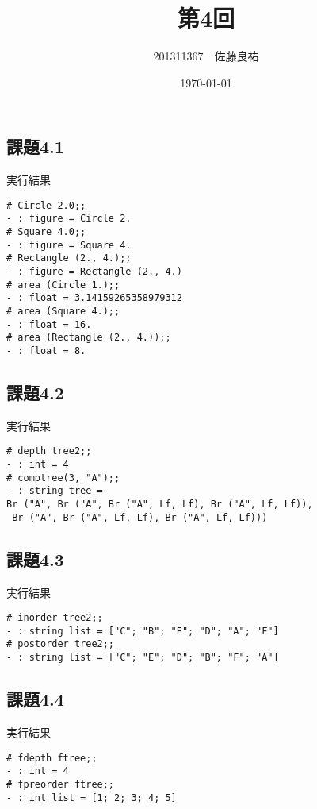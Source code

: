 \documentclass[11pt,a4j]{jarticle}
\title{第4回}
\author{201311367　佐藤良祐}
\date{\today}
\begin{document}
\subsection*{課題4.1}

実行結果
\begin{lstlisting}
# Circle 2.0;;
- : figure = Circle 2.
# Square 4.0;;
- : figure = Square 4.
# Rectangle (2., 4.);;
- : figure = Rectangle (2., 4.)
# area (Circle 1.);;
- : float = 3.14159265358979312
# area (Square 4.);;
- : float = 16.
# area (Rectangle (2., 4.));;
- : float = 8.
\end{lstlisting}
\subsection*{課題4.2}

\newpage
実行結果
\begin{lstlisting}
# depth tree2;;
- : int = 4
# comptree(3, "A");;
- : string tree =
Br ("A", Br ("A", Br ("A", Lf, Lf), Br ("A", Lf, Lf)),
 Br ("A", Br ("A", Lf, Lf), Br ("A", Lf, Lf)))
\end{lstlisting}
\subsection*{課題4.3}

実行結果
\begin{lstlisting}
# inorder tree2;;
- : string list = ["C"; "B"; "E"; "D"; "A"; "F"]
# postorder tree2;;
- : string list = ["C"; "E"; "D"; "B"; "F"; "A"]
\end{lstlisting}
\newpage
  \subsection*{課題4.4}
  
実行結果
\begin{lstlisting}
# fdepth ftree;;
- : int = 4
# fpreorder ftree;;
- : int list = [1; 2; 3; 4; 5]
\end{lstlisting}
\end{document}

